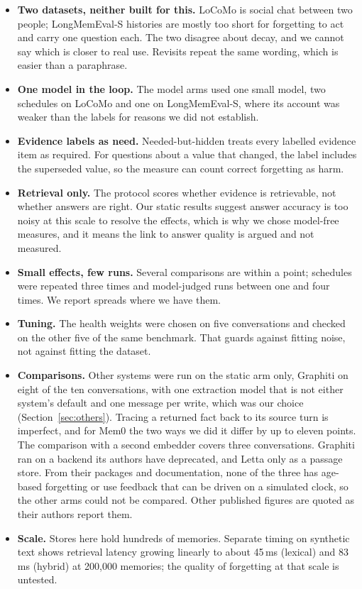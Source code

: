\documentclass[11pt]{article}
\begin{document}
\begin{itemize}
\item \textbf{Two datasets, neither built for this.} LoCoMo is social
  chat between two people; LongMemEval-S histories are mostly too
  short for forgetting to act and carry one question each. The two
  disagree about decay, and we cannot say which is closer to real use.
  Revisits repeat the same wording, which is easier than a paraphrase.
\item \textbf{One model in the loop.} The model arms used one small
  model, two schedules on LoCoMo and one on LongMemEval-S, where its
  account was weaker than the labels for reasons we did not establish.
\item \textbf{Evidence labels as need.} Needed-but-hidden treats every
  labelled evidence item as required. For questions about a value that
  changed, the label includes the superseded value, so the measure
  can count correct forgetting as harm.
\item \textbf{Retrieval only.} The protocol scores whether evidence is
  retrievable, not whether answers are right. Our static results
  suggest answer accuracy is too noisy at this scale to resolve the
  effects, which is why we chose model-free measures, and it means the
  link to answer quality is argued and not measured.
\item \textbf{Small effects, few runs.} Several comparisons are within
  a point; schedules were repeated three times and model-judged runs
  between one and four times. We report spreads where we have them.
\item \textbf{Tuning.} The health weights were chosen on five
  conversations and checked on the other five of the same benchmark.
  That guards against fitting noise, not against fitting the dataset.
\item \textbf{Comparisons.} Other systems were run on the static arm
  only, Graphiti on eight of the ten conversations, with one extraction model
  that is not either system's default and one message per write, which
  was our choice (Section~\ref{sec:others}). Tracing a returned fact
  back to its source turn is imperfect, and for Mem0 the two ways we
  did it differ by up to eleven points. The comparison with a second
  embedder covers three conversations. Graphiti ran on a backend its
  authors have deprecated, and Letta only as a passage store. From
  their packages and documentation, none of the three has age-based
  forgetting or use feedback that can be driven on a simulated clock,
  so the other arms could not be compared. Other published figures are
  quoted as their authors report them.
\item \textbf{Scale.} Stores here hold hundreds of memories. Separate
  timing on synthetic text shows retrieval latency growing linearly to
  about 45\,ms (lexical) and 83\,ms (hybrid) at 200{,}000 memories; the
  quality of forgetting at that scale is untested.
\end{itemize}
\end{document}
